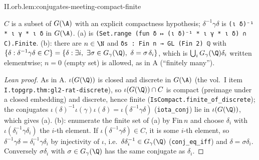 \begin{lemma}
\end{lemma}
\begin{tfformal}{II.orb.lem:conjugates-meeting-compact-finite}
\begin{tffidelity}
$C$ is a subset of $G(\A)$ with an explicit compactness hypothesis; $\delta^{-1}\gamma\delta$ is \texttt{(ι δ)⁻¹ * ι γ * ι δ} in $G(\A)$. (a) is \texttt{(Set.range (fun δ ↦ (ι δ)⁻¹ * ι γ * ι δ) ∩ C).Finite}. (b): there are $n\in\N$ and \texttt{δs : Fin n → GL (Fin 2) ℚ} with $\{\delta:\delta^{-1}\gamma\delta\in C\}=\{\delta:\exists i,\ \exists\sigma\in G_\gamma(\Q),\ \delta=\sigma\,\delta_i\}$, which is $\bigcup_iG_\gamma(\Q)\delta_i$ written elementwise; $n=0$ (empty set) is allowed, as in A (``finitely many'').
\end{tffidelity}
\end{tfformal}
\begin{proof}[Lean proof]
As in A. $\iota(G(\Q))$ is closed and discrete in $G(\A)$ (the vol.~I item \texttt{I.topgrp.thm:gl2-rat-discrete}), so $\iota(G(\Q))\cap C$ is compact (preimage under a closed embedding) and discrete, hence finite (\texttt{IsCompact.finite\_of\_discrete}); the conjugates $\iota(\delta)^{-1}\iota(\gamma)\iota(\delta)=\iota(\delta^{-1}\gamma\delta)$ (\texttt{iota\_conj}) lie in $\iota(G(\Q))$, which gives (a). (b): enumerate the finite set of (a) by $\mathrm{Fin}\,n$ and choose $\delta_i$ with $\iota(\delta_i^{-1}\gamma\delta_i)$ the $i$-th element. If $\iota(\delta^{-1}\gamma\delta)\in C$, it is some $i$-th element, so $\delta^{-1}\gamma\delta=\delta_i^{-1}\gamma\delta_i$ by injectivity of $\iota$, i.e.\ $\delta\delta_i^{-1}\in G_\gamma(\Q)$ (\texttt{conj\_eq\_iff}) and $\delta=\sigma\delta_i$. Conversely $\sigma\delta_i$ with $\sigma\in G_\gamma(\Q)$ has the same conjugate as $\delta_i$.
\end{proof}


